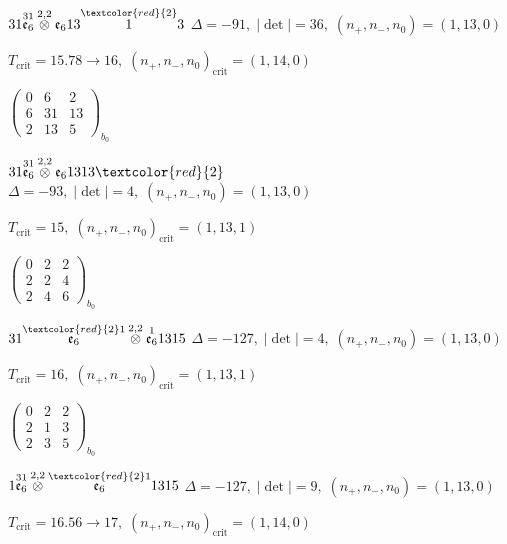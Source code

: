 \documentclass[10pt]{article}
\begin{document}
$31\overset{31}{\mathfrak{e}_6}\overset{2,2}{\otimes}\mathfrak{e}_613\overset{\textcolor{red}{2}}{1}3$ \quad $\Delta=-91,\; |\det|=36,\; (n_+,n_-,n_0)=(1,13,0)$

\hspace{1em}$T_{\text{crit}}=15.78 \to 16,\; (n_+,n_-,n_0)_{\text{crit}}=(1,14,0)$

\hspace{2em}$\left(\begin{smallmatrix}0 & 6 & 2 \\ 6 & 31 & 13 \\ 2 & 13 & 5\end{smallmatrix}\right)_{\!b_0}$

$31\overset{31}{\mathfrak{e}_6}\overset{2,2}{\otimes}\mathfrak{e}_61313\textcolor{red}{2}$ \quad $\Delta=-93,\; |\det|=4,\; (n_+,n_-,n_0)=(1,13,0)$

\hspace{1em}$T_{\text{crit}}=15,\; (n_+,n_-,n_0)_{\text{crit}}=(1,13,1)$

\hspace{2em}$\left(\begin{smallmatrix}0 & 2 & 2 \\ 2 & 2 & 4 \\ 2 & 4 & 6\end{smallmatrix}\right)_{\!b_0}$

\smallskip

$31\overset{\textcolor{red}{2}1}{\mathfrak{e}_6}\overset{2,2}{\otimes}\overset{1}{\mathfrak{e}_6}1315$ \quad $\Delta=-127,\; |\det|=4,\; (n_+,n_-,n_0)=(1,13,0)$

\hspace{1em}$T_{\text{crit}}=16,\; (n_+,n_-,n_0)_{\text{crit}}=(1,13,1)$

\hspace{2em}$\left(\begin{smallmatrix}0 & 2 & 2 \\ 2 & 1 & 3 \\ 2 & 3 & 5\end{smallmatrix}\right)_{\!b_0}$

$1\overset{31}{\mathfrak{e}_6}\overset{2,2}{\otimes}\overset{\textcolor{red}{2}1}{\mathfrak{e}_6}1315$ \quad $\Delta=-127,\; |\det|=9,\; (n_+,n_-,n_0)=(1,13,0)$

\hspace{1em}$T_{\text{crit}}=16.56 \to 17,\; (n_+,n_-,n_0)_{\text{crit}}=(1,14,0)$
\end{document}
